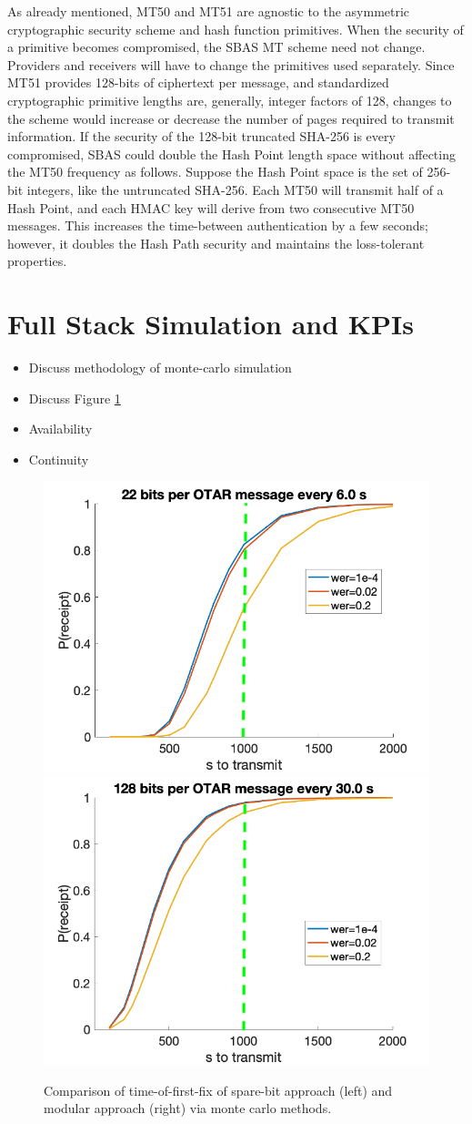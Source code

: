 \documentclass[letterpaper,times]{IONconf/IONconf}
\begin{document}
As already mentioned, MT50 and MT51 are agnostic to the asymmetric cryptographic security scheme and hash function primitives.
When the security of a primitive becomes compromised, the SBAS MT scheme need not change.
Providers and receivers will have to change the primitives used separately.
Since MT51 provides 128-bits of ciphertext per message, and standardized cryptographic primitive lengths are, generally, integer factors of 128, changes to the scheme would increase or decrease the number of pages required to transmit information.
If the security of the 128-bit truncated SHA-256 is every compromised, SBAS could double the Hash Point length space without affecting the MT50 frequency as follows.
Suppose the Hash Point space is the set of 256-bit integers, like the untruncated SHA-256.
Each MT50 will transmit half of a Hash Point, and each HMAC key will derive from two consecutive MT50 messages.
This increases the time-between authentication by a few seconds; however, it doubles the Hash Path security and maintains the loss-tolerant properties.

\pagebreak

\section{Full Stack Simulation and KPIs} \label{sec: experiment}

\begin{itemize}
	\item Discuss methodology of monte-carlo simulation
	\item Discuss Figure \ref{fig:time-of-first-fix-mc}
	\item Availability
	\item Continuity
\end{itemize}

\begin{figure}[H]
	\centering
	\includegraphics[width=0.4\linewidth]{fig/integrated_mc.png}
	\includegraphics[width=0.4\linewidth]{fig/modular_mc.png}
	\caption{Comparison of time-of-first-fix of spare-bit approach (left) and modular approach (right) via monte carlo methods.}
	\label{fig:time-of-first-fix-mc}
\end{figure}
\end{document}
